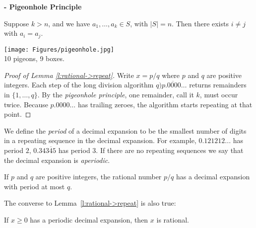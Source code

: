 \documentclass[11pt,dvipsnames]{book}
\numberwithin{equation}{section} %
\numberwithin{figure}{section} %
\numberwithin{table}{section} %
\begin{document}
%
\noindent

\begin{definition} {\bf - Pigeonhole Principle}\\
\begin{minipage}[c]{0.4\linewidth}
Suppose $k>n$, and we have $a_1,\ldots, a_k \in S$, with $|S|=n$.  Then there exists $i\neq j$ with $a_i=a_j$.
\end{minipage} 
\hspace{.2\linewidth}
\begin{minipage}[c]{0.4\linewidth}
\begin{center}
\texttt{[image: Figures/pigeonhole.jpg]}\\
10 pigeons, 9 boxes.
\end{center}
\end{minipage}
\end{definition}

\vspace{.5cm}


\begin{proof}[Proof of Lemma \ref{l:rational->repeat}]
Write $x=p/q$ where $p$ and $q$ are positive integers. Each step of the long division algorithm $q\overline{)p.0000\ldots}$ returns remainders in $\{1,\ldots, q\}$.  By the \emph{pigeonhole principle}, one remainder, call it $k$, must occur twice.  Because $p.0000\ldots$ has trailing zeroes, the algorithm starts repeating at that point.
\end{proof}

We define the {\it period} of a decimal expansion to be the smallest number of digits in a repeating sequence in the decimal expansion. For example, $0.121212...$ has period $2$, $0.34\overline{345}$ has period 3. If there are no repeating sequences we say that the decimal expansion is {\it aperiodic}.

\begin{corollary} If $p$ and $q$ are positive integers, the rational number $p/q$ has a decimal expansion with period at most $q$.\end{corollary}




The converse to Lemma~\ref{l:rational->repeat} is also true:

\begin{lemma}
If $x\geq 0$ has a periodic decimal expansion, then $x$ is rational.
\end{lemma}
\end{document}
